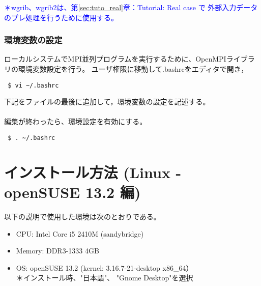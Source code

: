 \noindent \textcolor{blue}{\small ＊wgrib、wgrib2は、第\ref{sec:tuto_real}章：Tutorial: Real case で
外部入力データのプレ処理を行うために使用する。}


\subsubsection{環境変数の設定}

ローカルシステムでMPI並列プログラムを実行するために、OpenMPIライブラリの環境変数設定を行う。
ユーザ権限に移動して.bashrcをエディタで開き，
\begin{verbatim}
 $ vi ~/.bashrc
\end{verbatim}
下記をファイルの最後に追加して，環境変数の設定を記述する。\\

\\

編集が終わったら、環境設定を有効にする。
\begin{verbatim}
 $ . ~/.bashrc
\end{verbatim}


\section{インストール方法 (Linux - openSUSE 13.2 編)}

以下の説明で使用した環境は次のとおりである。
\begin{itemize}
\item CPU: Intel Core i5 2410M (sandybridge)
\item Memory: DDR3-1333 4GB
\item OS: openSUSE 13.2 (kernel: 3.16.7-21-desktop x86\_64）\\
{\small ＊インストール時、"日本語"、 "Gnome Desktop"を選択}
\end{itemize}

